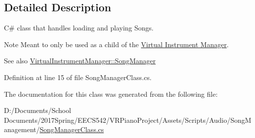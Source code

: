 \subsection{Detailed Description}
C\# class that handles loading and playing Songs. 

\begin{DoxyNote}{Note}
Meant to only be used as a child of the \hyperlink{group___v_i_m}{Virtual Instrument Manager}.
\end{DoxyNote}
\begin{DoxySeeAlso}{See also}
\hyperlink{group___v_i_m_pub_ga33dae94932c10c66db76a0eebec76b01}{Virtual\+Instrument\+Manager\+::\+Song\+Manager} 
\end{DoxySeeAlso}


Definition at line 15 of file Song\+Manager\+Class.\+cs.



The documentation for this class was generated from the following file\+:\begin{DoxyCompactItemize}
\item 
D\+:/\+Documents/\+School Documents/2017\+Spring/\+E\+E\+C\+S542/\+V\+R\+Piano\+Project/\+Assets/\+Scripts/\+Audio/\+Song\+Management/\hyperlink{_song_manager_class_8cs}{Song\+Manager\+Class.\+cs}\end{DoxyCompactItemize}
